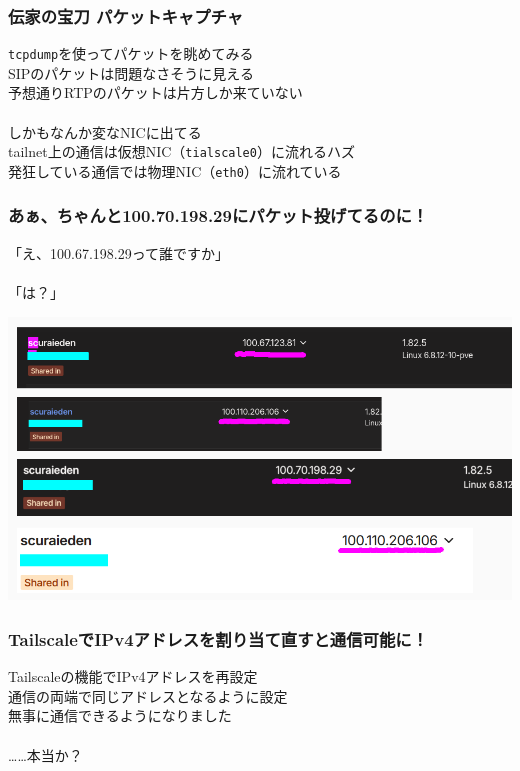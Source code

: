 \documentclass[
  lualatex,
  aspectratio=169,
  14pt
]{beamer}
\begin{document}
\begin{frame}
  \frametitle{伝家の宝刀 パケットキャプチャ}

  \texttt{tcpdump}を使ってパケットを眺めてみる\\
  \hspace{1.5\zw}SIPのパケットは問題なさそうに見える\\
  \hspace{1.5\zw}予想通りRTPのパケットは片方しか来ていない
  \\~\\[-.5\baselineskip]

  しかもなんか変なNICに出てる\\
  \hspace{1.5\zw}tailnet上の通信は仮想NIC（\texttt{tialscale0}）に流れるハズ\\
  \hspace{1.5\zw}発狂している通信では物理NIC（\texttt{eth0}）に流れている

  \note{ }
\end{frame}

\begin{frame}
  \frametitle{あぁ、ちゃんと100.70.198.29にパケット投げてるのに！}

  「え、100.67.198.29って誰ですか」
  \\~\\[2\baselineskip]

  「は？」

  \note{ }
\end{frame}

\begin{frame}
  \centering
  \includegraphics[height=.9\textheight]{./images/hakkyo.png}
\end{frame}

\begin{frame}
  \frametitle{TailscaleでIPv4アドレスを割り当て直すと通信可能に！}

  Tailscaleの機能でIPv4アドレスを再設定\\
  \hspace{1.5\zw}通信の両端で同じアドレスとなるように設定\\
  \hspace{1.5\zw}無事に通信できるようになりました
  \\~\\[-.5\baselineskip]

  \hfill ……本当か？

  \note{ }
\end{frame}
\end{document}
